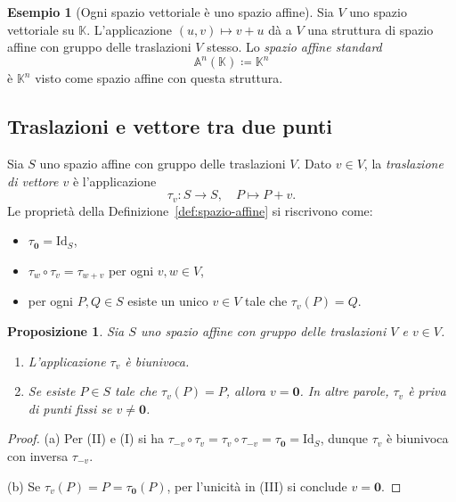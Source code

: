 \documentclass[11pt, a4paper]{book}
\theoremstyle{definition}
\newtheorem{esempio}[definizione]{Esempio}
\theoremstyle{plain}
\newtheorem{proposizione}[definizione]{Proposizione}
\theoremstyle{remark}
\newcommand{\K}{\mathbb{K}}
\newcommand{\Id}{\mathrm{Id}}
\begin{document}
\begin{exbox}
\begin{esempio}[Ogni spazio vettoriale è uno spazio affine]
\label{es:V-come-affine}
Sia $V$ uno spazio vettoriale su $\K$. L'applicazione $(u, v) \mapsto v + u$ dà a $V$ una struttura di spazio affine con gruppo delle traslazioni $V$ stesso. Lo \emph{spazio affine standard}
\[
  \mathbb{A}^n(\K) \coloneqq \K^n
\]
è $\K^n$ visto come spazio affine con questa struttura.
\end{esempio}
\end{exbox}

\subsection{Traslazioni e vettore tra due punti}

Sia $S$ uno spazio affine con gruppo delle traslazioni $V$. Dato $v \in V$, la \emph{traslazione di vettore $v$} è l'applicazione
\[
  \tau_v \colon S \to S, \quad P \mapsto P + v.
\]
Le proprietà della Definizione~\ref{def:spazio-affine} si riscrivono come:
\begin{itemize}
  \item[(I)] $\tau_{\mathbf{0}} = \Id_S$,
  \item[(II)] $\tau_w \circ \tau_v = \tau_{w+v}$ per ogni $v, w \in V$,
  \item[(III)] per ogni $P, Q \in S$ esiste un unico $v \in V$ tale che $\tau_v(P) = Q$.
\end{itemize}

\begin{proposizione}
\label{prop:tau-biunivoca}
Sia $S$ uno spazio affine con gruppo delle traslazioni $V$ e $v \in V$.
\begin{enumerate}[label=(\alph*)]
  \item L'applicazione $\tau_v$ è biunivoca.
  \item Se esiste $P \in S$ tale che $\tau_v(P) = P$, allora $v = \mathbf{0}$. In altre parole, $\tau_v$ è priva di punti fissi se $v \neq \mathbf{0}$.
\end{enumerate}
\end{proposizione}

\begin{proof}
(a) Per (II) e (I) si ha $\tau_{-v} \circ \tau_v = \tau_v \circ \tau_{-v} = \tau_{\mathbf{0}} = \Id_S$, dunque $\tau_v$ è biunivoca con inversa $\tau_{-v}$.

(b) Se $\tau_v(P) = P = \tau_{\mathbf{0}}(P)$, per l'unicità in (III) si conclude $v = \mathbf{0}$.
\end{proof}
\end{document}
